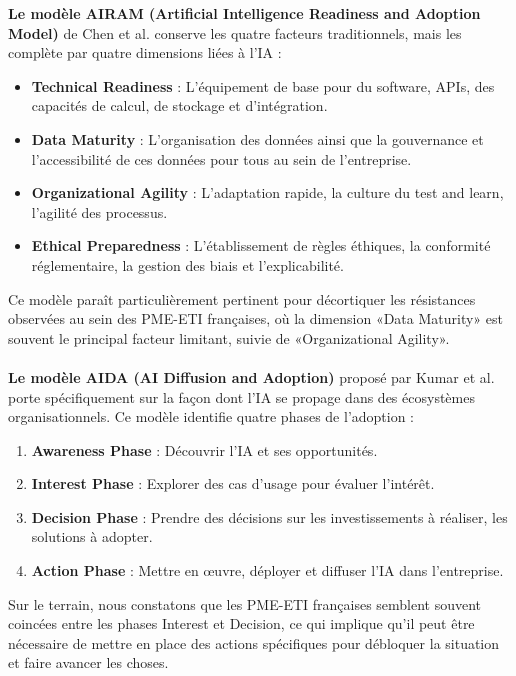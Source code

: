 \textbf{Le modèle AIRAM (Artificial Intelligence Readiness and Adoption Model)} de Chen et al. conserve les quatre facteurs traditionnels, mais les complète par quatre dimensions liées à l’IA :

\begin{itemize}
    \item \textbf{Technical Readiness} : L’équipement de base pour du software, APIs, des capacités de calcul, de stockage et d’intégration.
    \item \textbf{Data Maturity} : L’organisation des données ainsi que la gouvernance et l’accessibilité de ces données pour tous au sein de l’entreprise.
    \item \textbf{Organizational Agility} : L’adaptation rapide, la culture du test and learn, l’agilité des processus.
    \item \textbf{Ethical Preparedness} : L’établissement de règles éthiques, la conformité réglementaire, la gestion des biais et l’explicabilité.
\end{itemize}
\medskip
Ce modèle paraît particulièrement pertinent pour décortiquer les résistances observées au sein des PME-ETI françaises, où la dimension «Data Maturity» est souvent le principal facteur limitant, suivie de «Organizational Agility».
\\\\
\textbf{Le modèle AIDA (AI Diffusion and Adoption)} proposé par Kumar et al. porte spécifiquement sur la façon dont l’IA se propage dans des écosystèmes organisationnels. Ce modèle identifie quatre phases de l’adoption :

\begin{enumerate}
    \item \textbf{Awareness Phase} : Découvrir l’IA et ses opportunités.
    \item \textbf{Interest Phase} : Explorer des cas d’usage pour évaluer l’intérêt.
    \item \textbf{Decision Phase} : Prendre des décisions sur les investissements à réaliser, les solutions à adopter.
    \item \textbf{Action Phase} : Mettre en œuvre, déployer et diffuser l’IA dans l’entreprise.
\end{enumerate}

Sur le terrain, nous constatons que les PME-ETI françaises semblent souvent coincées entre les phases Interest et Decision, ce qui implique qu’il peut être nécessaire de mettre en place des actions spécifiques pour débloquer la situation et faire avancer les choses.

